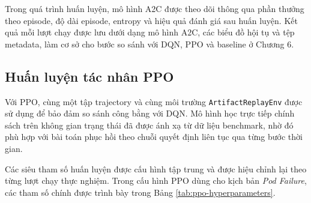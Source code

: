 Trong quá trình huấn luyện, mô hình A2C được theo dõi thông qua phần thưởng theo episode, độ dài episode, entropy và hiệu quả đánh giá sau huấn luyện. Kết quả mỗi lượt chạy được lưu dưới dạng mô hình A2C, các biểu đồ hội tụ và tệp metadata, làm cơ sở cho bước so sánh với DQN, PPO và baseline ở Chương 6.

\subsection{Huấn luyện tác nhân PPO}

Với PPO, cùng một tập trajectory và cùng môi trường \texttt{ArtifactReplayEnv} được sử dụng để bảo đảm so sánh công bằng với DQN. Mô hình học trực tiếp chính sách trên không gian trạng thái đã được ánh xạ từ dữ liệu benchmark, nhờ đó phù hợp với bài toán phục hồi theo chuỗi quyết định liên tục qua từng bước thời gian.

Các siêu tham số huấn luyện được cấu hình tập trung và được hiệu chỉnh lại theo từng lượt chạy thực nghiệm. Trong cấu hình PPO dùng cho kịch bản \textit{Pod Failure}, các tham số chính được trình bày trong Bảng \ref{tab:ppo-hyperparameters}.

